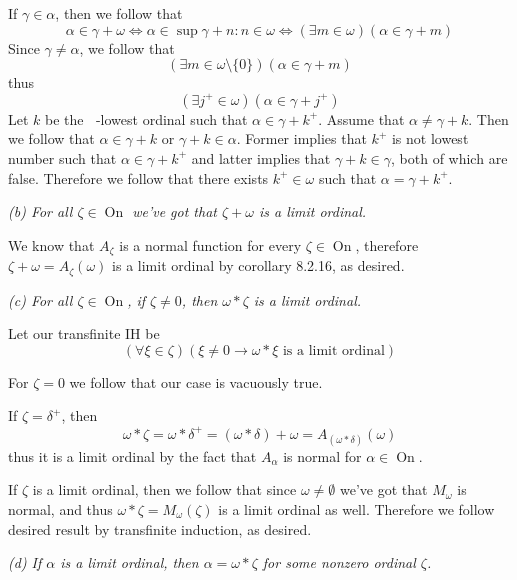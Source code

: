 \documentclass[11pt,oneside,titlepage]{book}
\DeclareMathOperator \lra {\Leftrightarrow}
\DeclareMathOperator \On {On}
\DeclareMathOperator \ineq {\underline{\in}}
\newcommand{\set}[1]{\{ #1 \}}
\begin{document}
If $\gamma \in \alpha$, then we follow that
$$\alpha \in \gamma + \omega \lra \alpha \in \sup{\gamma + n: n \in \omega} \lra
(\exists m \in \omega)(\alpha \in \gamma + m)$$
Since $\gamma \neq \alpha$, we follow that
$$(\exists m \in \omega \setminus \set{0})(\alpha \in \gamma + m)$$
thus
$$(\exists j^+ \in \omega )(\alpha \in \gamma + j^+)$$
Let $k$ be the $\ineq$-lowest ordinal such that $\alpha \in \gamma + k^+$.
Assume that $\alpha \neq \gamma + k$. Then we follow that $\alpha \in \gamma + k$
or $\gamma + k \in \alpha$. Former implies that $k^+$ is not lowest number such that
$\alpha \in \gamma + k^+$ and latter implies that $\gamma + k \in \gamma$,
both of which are false. Therefore we follow that there exists $k^+ \in \omega$
such that $\alpha = \gamma + k^+$.

\textit{(b) For all $\zeta \in \On$ we've got that $\zeta + \omega$ is a limit
  ordinal.}

We know that $A_\zeta$ is a normal function for every $\zeta \in \On$, therefore
$\zeta + \omega = A_\zeta(\omega)$ is a limit ordinal by corollary 8.2.16, as desired.

\textit{(c) For all $\zeta \in \On$, if $\zeta \neq 0$, then $\omega * \zeta$ is a limit
  ordinal.}

Let our transfinite IH be
$$(\forall \xi \in \zeta)(\xi \neq 0 \to \omega * \xi \text{ is a limit ordinal})$$

For $\zeta = 0$ we follow that our case is vacuously true.

If $\zeta = \delta^+$, then
$$\omega * \zeta = \omega * \delta^+ = (\omega * \delta) + \omega = A_{(\omega * \delta)}(\omega)$$
thus it is a limit ordinal by the fact that $A_\alpha$ is normal for $\alpha \in \On$.

If $\zeta$ is a limit ordinal, then we follow that since $\omega \neq \emptyset$
we've got that $M_\omega$ is normal, and thus $\omega * \zeta = M_\omega(\zeta)$ is a
limit ordinal as well. Therefore we follow desired result by transfinite induction, as desired.

\textit{(d) If $\alpha$ is a limit ordinal, then $\alpha = \omega * \zeta$ for
  some nonzero ordinal $\zeta$.}
\end{document}
